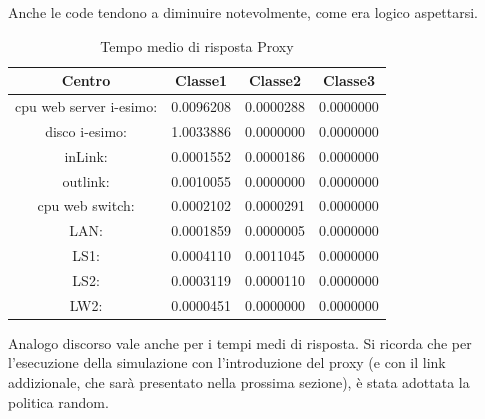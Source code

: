Anche le code tendono a diminuire notevolmente, come era logico aspettarsi. 
\begin{table}[H]
\begin{center}
\begin{tabular}{||c|c|c|c||}
\hline
Centro &Classe1 &Classe2 &Classe3\\
\hline
\hline
 cpu web server i-esimo: 	&0.0096208	&0.0000288	&0.0000000\\
\hline
 disco i-esimo: 	&1.0033886	&0.0000000	&0.0000000\\
\hline
 inLink: 	&0.0001552	&0.0000186	&0.0000000\\
\hline
 outlink: 	&0.0010055	&0.0000000	&0.0000000\\
\hline
 cpu web switch: 	&0.0002102	&0.0000291	&0.0000000\\
\hline
 LAN: 	&0.0001859	&0.0000005	&0.0000000\\
\hline
 LS1: 	&0.0004110	&0.0011045	&0.0000000\\
\hline
 LS2: 	&0.0003119	&0.0000110	&0.0000000\\
\hline
 LW2: 	&0.0000451	&0.0000000	&0.0000000\\
\hline
\end{tabular}
\end{center}
\caption{Tempo medio di risposta Proxy}
\label{tempomediodirisposta}
\end{table}
Analogo discorso vale anche per i tempi medi di risposta. Si ricorda che per l'esecuzione della simulazione con l'introduzione del proxy (e con il link addizionale, che sarà presentato nella prossima  sezione), è stata adottata la politica random.

